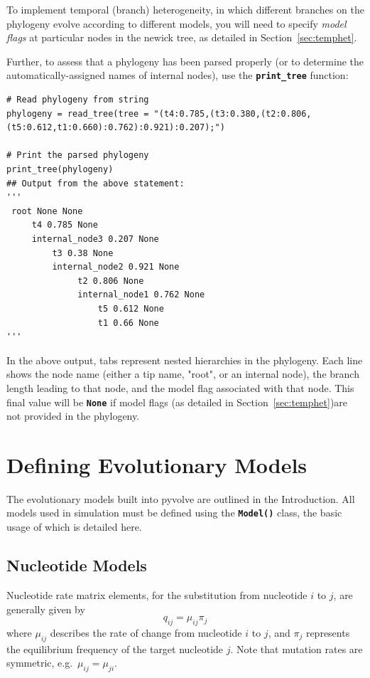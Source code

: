 \documentclass{article}
\newcommand{\code}[1]{\textbf{\texttt{\small{#1}}}}
\begin{document}
To implement temporal (branch) heterogeneity, in which different branches on the phylogeny evolve according to different models, you will need to specify \emph{model flags} at particular nodes in the newick tree, as detailed in Section~\ref{sec:temphet}.

Further, to assess that a phylogeny has been parsed properly (or to determine the automatically-assigned names of internal nodes), use the \code{print\_tree} function:
\begin{lstlisting}
# Read phylogeny from string
phylogeny = read_tree(tree = "(t4:0.785,(t3:0.380,(t2:0.806,(t5:0.612,t1:0.660):0.762):0.921):0.207);")

# Print the parsed phylogeny
print_tree(phylogeny)
## Output from the above statement:
'''
 root None None
     t4 0.785 None
     internal_node3 0.207 None
         t3 0.38 None
         internal_node2 0.921 None
              t2 0.806 None
              internal_node1 0.762 None
                  t5 0.612 None
                  t1 0.66 None
'''
\end{lstlisting}
In the above output, tabs represent nested hierarchies in the phylogeny. Each line shows the node name (either a tip name, "root", or an internal node), the branch length leading to that node, and the model flag associated with that node. This final value will be \code{None} if model flags (as detailed in Section~\ref{sec:temphet})are not provided in the phylogeny.



\section{Defining Evolutionary Models}\label{sec:evomodels}

The evolutionary models built into pyvolve are outlined in the Introduction. All models used in simulation must be defined using the \code{Model()} class, the basic usage of which is detailed here.

\subsection{Nucleotide Models}\label{sec:nucleotide_basic}

Nucleotide rate matrix elements, for the substitution from nucleotide $i$ to $j$, are generally given by 
\begin{equation}
q_{ij} = \mu_{ij} \pi_j
\end{equation}
where $\mu_{ij}$ describes the rate of change from nucleotide $i$ to $j$, and $\pi_j$ represents the equilibrium frequency of the target nucleotide $j$. Note that mutation rates are symmetric, e.g.\ $\mu_{ij} = \mu_{ji}$. 
\end{document}
